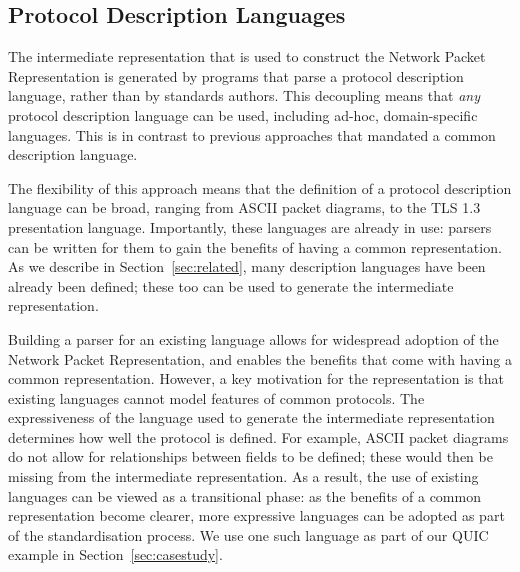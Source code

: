 \documentclass[10pt,sigconf]{acmart}
\begin{document}


\subsection{Protocol Description Languages}
\label{sec:npr-input}

The intermediate representation that is used to construct the Network Packet
Representation is generated by programs that parse a protocol description language, rather
than by standards authors. This decoupling means that \emph{any} protocol description
language can be used, including ad-hoc, domain-specific languages. This is in contrast to
previous approaches that mandated a common description language.

The flexibility of this approach means that the definition of a protocol description
language can be broad, ranging from ASCII packet diagrams, to the TLS 1.3 presentation
language. Importantly, these languages are already in use: parsers can be written for them
to gain the benefits of having a common representation. As we describe in
Section~\ref{sec:related}, many description languages have been already been defined;
these too can be used to generate the intermediate representation.

Building a parser for an existing language allows for widespread adoption of the Network
Packet Representation, and enables the benefits that come with having a common
representation. However, a key motivation for the representation is that existing
languages cannot model features of common protocols. The expressiveness of the language
used to generate the intermediate representation determines how well the protocol is
defined. For example, ASCII packet diagrams do not allow for relationships between fields
to be defined; these would then be missing from the intermediate representation. As a
result, the use of existing languages can be viewed as a transitional phase: as the
benefits of a common representation become clearer, more expressive languages can be
adopted as part of the standardisation process. We use one such language as part of our
QUIC example in Section~\ref{sec:casestudy}.
\end{document}
